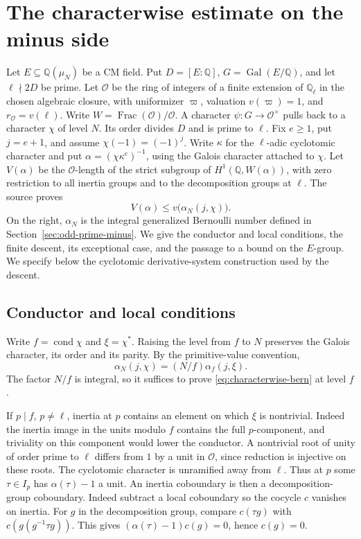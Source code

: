 \section{The characterwise estimate on the minus side}
\label{sec:minus-characterwise}

Let \(E\subseteq\mathbb Q(\mu_N)\) be a CM field. Put
\(D=[E:\mathbb Q]\), \(G=\operatorname{Gal}(E/\mathbb Q)\), and
let \(\ell\nmid 2D\) be prime. Let \(\mathcal O\) be the ring of
integers of a finite extension of \(\mathbb Q_\ell\) in the chosen
algebraic closure, with uniformizer \(\varpi\), valuation
\(v(\varpi)=1\), and \(r_{\mathcal O}=v(\ell)\).
Write \(W=\operatorname{Frac}(\mathcal O)/\mathcal O\). A character
\(\psi:G\to\mathcal O^\times\) pulls back to a character \(\chi\) of
level \(N\). Its order divides \(D\) and is prime to \(\ell\).
Fix \(e\ge1\), put \(j=e+1\), and assume \(\chi(-1)=(-1)^j\).
Write \(\kappa\) for the \(\ell\)-adic cyclotomic character and put
\(\alpha=(\chi\kappa^e)^{-1}\), using the Galois character attached
to \(\chi\). Let \(V(\alpha)\) be the \(\mathcal O\)-length of the
strict subgroup of \(H^1(\mathbb Q,W(\alpha))\), with zero restriction
to all inertia groups and to the decomposition groups at \(\ell\).
The source proves
\begin{equation}
    V(\alpha)\le v\bigl(\alpha_N(j,\chi)\bigr).
    \label{eq:characterwise-bern}
\end{equation}
On the right, \(\alpha_N\) is the integral generalized Bernoulli
number defined in Section~\ref{sec:odd-prime-minus}. We give the
conductor and local conditions, the finite descent, its exceptional
case, and the passage to a bound on the \(E\)-group. We specify below
the cyclotomic derivative-system construction used by the descent.

\subsection{Conductor and local conditions}

Write \(f=\operatorname{cond}\chi\) and \(\xi=\chi^*\). Raising the
level from \(f\) to \(N\) preserves the Galois character, its order
and its parity. By the primitive-value convention,
\[
  \alpha_N(j,\chi)=(N/f)\alpha_f(j,\xi).
\]
The factor \(N/f\) is integral, so it suffices to prove
\eqref{eq:characterwise-bern} at level \(f\).

If \(p\mid f\), \(p\ne\ell\), inertia at \(p\) contains an element
on which \(\xi\) is nontrivial. Indeed the inertia image in the units
modulo \(f\) contains the full \(p\)-component, and triviality on
this component would lower the conductor. A nontrivial root of unity
of order prime to \(\ell\) differs from \(1\) by a unit in
\(\mathcal O\), since reduction is injective on these roots. The
cyclotomic character is unramified away from \(\ell\). Thus at \(p\)
some \(\tau\in I_p\) has \(\alpha(\tau)-1\) a unit. An
inertia coboundary is then a decomposition-group coboundary.
Indeed subtract a local coboundary so the cocycle \(c\) vanishes on
inertia. For \(g\) in the decomposition group, compare \(c(\tau g)\)
with \(c(g(g^{-1}\tau g))\). This gives
\((\alpha(\tau)-1)c(g)=0\), hence \(c(g)=0\).


